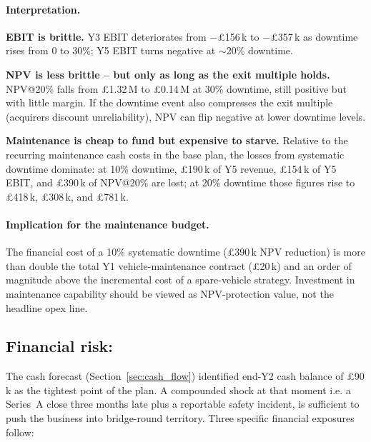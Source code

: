 \documentclass[11pt, a4paper]{report}
\numberwithin{equation}{section}
\begin{document}
\begin{refsection}
\paragraph{Interpretation.}
\begin{tightitemize}
  \item \textbf{EBIT is brittle.} Y3 EBIT deteriorates from
        $-$\pounds156\,k to $-$\pounds357\,k as downtime rises
        from 0 to 30\%; Y5 EBIT turns negative at $\sim$20\%
        downtime.
  \item \textbf{NPV is less brittle -- but only as long as the
        exit multiple holds.} NPV@20\% falls from
        \pounds1.32\,M to \pounds0.14\,M at 30\% downtime, still
        positive but with little margin. If the downtime event
        also compresses the exit multiple
        (acquirers discount unreliability), NPV can flip negative
        at lower downtime levels.
  \item \textbf{Maintenance is cheap to fund but expensive to starve.}
        Relative to the recurring maintenance cash costs in the base plan,
        the losses from systematic downtime dominate: at 10\% downtime,
        \pounds190\,k of Y5 revenue, \pounds154\,k of Y5 EBIT, and
        \pounds390\,k of NPV@20\% are lost; at 20\% downtime those figures
        rise to \pounds418\,k, \pounds308\,k, and \pounds781\,k.
\end{tightitemize}

\paragraph{Implication for the maintenance budget.} The financial
cost of a 10\% systematic downtime (\pounds390\,k NPV reduction) is
more than double the total Y1 vehicle-maintenance contract
(\pounds20\,k) and an order of magnitude above the incremental
cost of a spare-vehicle strategy. Investment in maintenance
capability should be viewed as NPV-protection
value, not the headline opex line.

\subsection{Financial risk:}
\label{sec:cash_risk}

The cash forecast (Section~\ref{sec:cash_flow}) identified
end-Y2 cash balance of \pounds90\,k as the tightest point of the
plan. A compounded shock at that moment i.e. a
Series~A close three months late plus a reportable safety
incident, is sufficient to push the business into bridge-round
territory. Three specific financial exposures follow:


\end{refsection}
\end{document}

